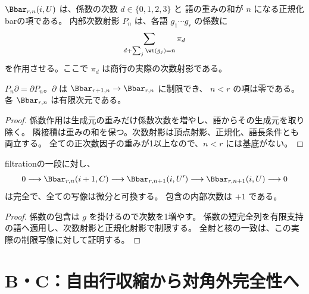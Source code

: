 \begin{definition}[内部次数成分]\label{def:bar-internal}
\leanok
{}
$\Bbar_{r,n}(i,U)$ は、係数の次数 $d\in\{0,1,2,3\}$ と
語の重みの和が $n$ になる正規化barの項である。
内部次数射影 $P_n$ は、各語 $g_1\cdots g_r$ の係数に
\[
 \sum_{d+\sum_j\wt(g_j)=n}\pi_d
\]
を作用させる。ここで $\pi_d$ は商行の実際の次数射影である。
\end{definition}

\begin{lemma}[次数射影と微分の両立]\label{lem:bar-projection}
\leanok
{}
$P_n\partial=\partial P_n$。$\partial$ は $\Bbar_{r+1,n}\to\Bbar_{r,n}$ に制限でき、
$n<r$ の項は零である。各 $\Bbar_{r,n}$ は有限次元である。
\end{lemma}
\begin{proof}\leanok
係数作用は生成元の重みだけ係数次数を増やし、語からその生成元を取り除く。
隣接積は重みの和を保つ。次数射影は頂点射影、正規化、語長条件とも両立する。
全ての正次数因子の重みが1以上なので、$n<r$ には基底がない。
\end{proof}

\begin{lemma}[内部次数ごとの短完全列]\label{lem:bar-short-exact}
\leanok
{}
filtrationの一段に対し、
\[
 0\longrightarrow \Bbar_{r,n}(i+1,C)
 \longrightarrow \Bbar_{r,n+1}(i,U')
 \longrightarrow \Bbar_{r,n+1}(i,U)\longrightarrow0
\]
は完全で、全ての写像は微分と可換する。
包含の内部次数は $+1$ である。
\end{lemma}
\begin{proof}\leanok
係数の包含は $g$ を掛けるので次数を1増やす。
係数の短完全列を有限支持の語へ適用し、次数射影と正規化射影で制限する。
全射と核の一致は、この実際の制限写像に対して証明する。
\end{proof}

\section{B・C：自由行収縮から対角外完全性へ}

